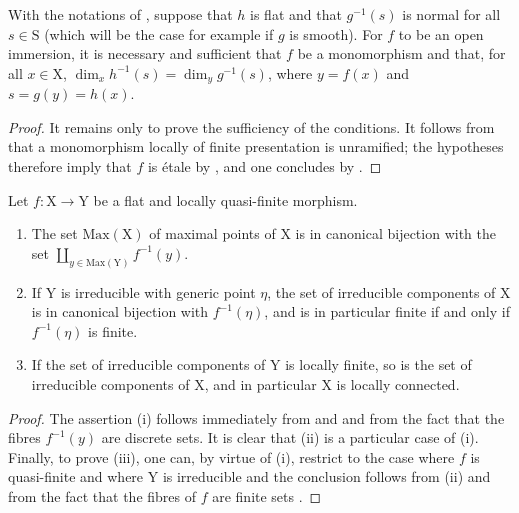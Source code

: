 \begin{corollary}[18.10.5]
\label{IV.18.10.5}
With the notations of , suppose that $h$ is flat and that $g^{-1}(s)$ is normal for all $s\in\mathrm{S}$ (which will be the case for example if $g$ is smooth).
For $f$ to be an open immersion, it is necessary and sufficient that $f$ be a monomorphism and that, for all $x\in\mathrm{X}$, $\dim_xh^{-1}(s)=\dim_yg^{-1}(s)$, where $y=f(x)$ and $s=g(y)=h(x)$.
\end{corollary}

\begin{proof}
It remains only to prove the sufficiency of the conditions. It follows from  that a monomorphism locally of finite presentation is unramified; the hypotheses therefore imply that $f$ is \'etale by , and one concludes by .
\end{proof}

\begin{lemma}[18.10.6]
\label{IV.18.10.6}
Let $f:\mathrm{X}\to\mathrm{Y}$ be a flat and locally quasi-finite morphism.
\begin{enumerate}[label=(\roman*)]
  \item The set $\mathrm{Max}(\mathrm{X})$ of maximal points of $\mathrm{X}$ is in canonical bijection with the set $\coprod_{y\in\mathrm{Max}(\mathrm{Y})}f^{-1}(y)$.
  \item If $\mathrm{Y}$ is irreducible with generic point $\eta$, the set of irreducible components of $\mathrm{X}$ is in canonical bijection with $f^{-1}(\eta)$, and is in particular finite if and only if $f^{-1}(\eta)$ is finite.
  \item If the set of irreducible components of $\mathrm{Y}$ is locally finite, so is the set of irreducible components of $\mathrm{X}$, and in particular $\mathrm{X}$ is locally connected.
\end{enumerate}
\end{lemma}

\begin{proof}
The assertion (i) follows immediately from  and  and from the fact that the fibres $f^{-1}(y)$ are discrete sets.
It is clear that (ii) is a particular case of (i).
Finally, to prove (iii), one can, by virtue of (i), restrict to the case where $f$ is quasi-finite and where $\mathrm{Y}$ is irreducible  and the conclusion follows from (ii) and from the fact that the fibres of $f$ are finite sets .
\end{proof}

